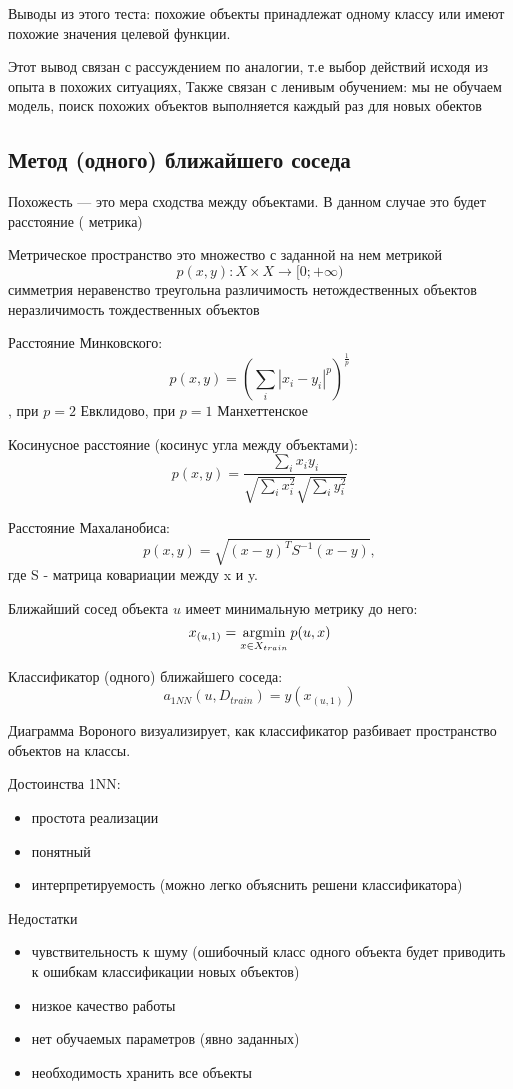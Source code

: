 Выводы из этого теста:
похожие объекты принадлежат одному классу или имеют похожие значения целевой функции.

Этот вывод связан с рассуждением по аналогии, т.е выбор действий исходя из опыта
в похожих ситуациях,
Также связан с ленивым обучением: мы не обучаем модель, поиск похожих объектов
выполняется каждый раз для новых обектов

\subsection{Метод (одного) ближайшего соседа}

Похожесть --- это мера сходства между объектами. В данном случае это будет расстояние (
метрика)

Метрическое пространство это множество с заданной на нем метрикой
\[
    p(x, y) : X \times X \to [0; +\infty)
\]
симметрия
неравенство треугольна
различимость нетождественных объектов
неразличимость тождественных объектов


Расстояние Минковского:
\[
    p(x, y) = \left( \sum_i |x_i - y_i|^p \right)^{\frac{1}{p}}
\], при $p = 2$ Евклидово, при $p = 1$ Манхеттенское

Косинусное расстояние (косинус угла между объектами):
\[
    p(x, y) = \frac{\sum_i x_i y_i}{\sqrt{\sum_i x^2_i} \sqrt{\sum_i y^2_i}}
\]

Расстояние Махаланобиса:
\[
    p(x, y) = \sqrt{(x - y)^T S^{-1}(x -y)},
\] где S - матрица ковариации между x и y.


Ближайший сосед объекта $u$ имеет минимальную метрику до него:
\[
    x_{(u,1)} = \operatorname*{argmin}_{x \in X_{train}} p(u, x)
\]

Классификатор (одного) ближайшего соседа:
\[
    a_{1NN}(u, D_{train}) = y(x_{(u,1)})
\]

Диаграмма Вороного визуализирует, как классификатор разбивает пространство
объектов на классы.

Достоинства 1NN:
\begin{itemize}
    \item простота реализации
    \item понятный
    \item интерпретируемость (можно легко объяснить решени классификатора)
\end{itemize}

Недостатки
\begin{itemize}
    \item чувствительность к шуму (ошибочный класс одного объекта будет приводить
        к ошибкам классификации новых объектов)
    \item низкое качество работы
    \item нет обучаемых параметров (явно заданных)
    \item необходимость хранить все объекты
\end{itemize}

